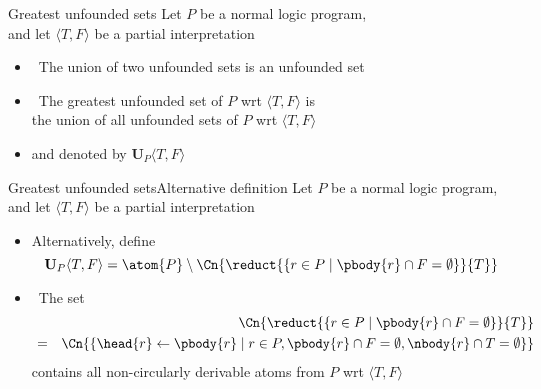 \begin{frame}{Greatest unfounded sets}{\phantom{Alternative definition}}\label{unf:greatest}
  Let $P$ be a normal logic program,\\ and let
  $\langle T,F \rangle$ be a partial interpretation
  \medskip
  \begin{itemize}
  \item<2->  \ The union of two unfounded sets is an unfounded set
    \medskip
  \item<3->   \ The \alert{greatest unfounded set} of $P$ wrt $\langle T,F \rangle$ is
    \\ the union of all unfounded sets of $P$ wrt $\langle T,F \rangle$
  \item<4-> [] and denoted by $\mathbf{U}_P\langle T,F \rangle$
  \end{itemize}
\end{frame}
\begin{frame}{Greatest unfounded sets}{Alternative definition}
  Let $P$ be a normal logic program,\\ and let
  $\langle T,F \rangle$ be a partial interpretation
  \medskip
  \begin{itemize}
  \item<1-> Alternatively, define
    \[
      \mathbf{U}_P\langle T,F \rangle =
      \atom{P} \setminus
      \Cn{\reduct{\{r \in P \mid \pbody{r} \cap F = \emptyset\}}{T}}
    \]
  \item<2->  \ The set
    \begin{eqnarray*}
      & & \Cn{\reduct{\{r \in P \mid \pbody{r} \cap F = \emptyset\}}{T}}\\
      &=& \Cn{\{\head{r}\leftarrow\pbody{r} \mid r\in P, \pbody{r} \cap F = \emptyset, \nbody{r}\cap T=\emptyset\}}
    \end{eqnarray*}
    contains all non-circularly derivable atoms from $P$ wrt $\langle T,F \rangle$
  \end{itemize}
\end{frame}
%
